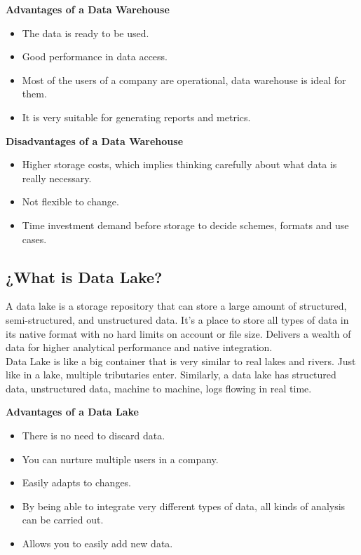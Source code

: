 \documentclass[twocolumn]{article}
\begin{document}
\textbf{\large Advantages of a Data Warehouse}
\begin{itemize}
    \item The data is ready to be used.
    \item Good performance in data access.
    \item Most of the users of a company are operational, data warehouse is ideal for them.
    \item It is very suitable for generating reports and metrics.
\end{itemize}

\textbf{\large Disadvantages of a Data Warehouse}
\begin{itemize}
    \item Higher storage costs, which implies thinking carefully about what data is really necessary.
    \item Not flexible to change.
    \item Time investment demand before storage to decide schemes, formats and use cases.
\end{itemize}

\subsection{¿What is Data Lake?}
\noindent A data lake is a storage repository that can store a large amount of structured, semi-structured, and unstructured data. It's a place to store all types of data in its native format with no hard limits on account or file size. Delivers a wealth of data for higher analytical performance and native integration.\\[0.1in]
Data Lake is like a big container that is very similar to real lakes and rivers. Just like in a lake, multiple tributaries enter. Similarly, a data lake has structured data, unstructured data, machine to machine, logs flowing in real time.
\begin{center}
\end{center}

\textbf{\large Advantages of a Data Lake}
\begin{itemize}
    
    \item There is no need to discard data.
    \item You can nurture multiple users in a company.
    \item Easily adapts to changes.
    \item By being able to integrate very different types of data, all kinds of analysis can be carried out.
    \item Allows you to easily add new data.
\end{itemize}
\end{document}
